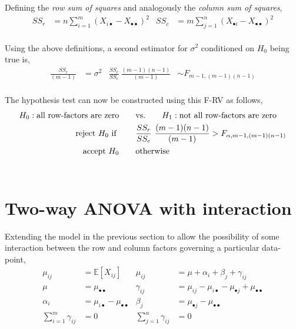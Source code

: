 Defining the \textit{row sum of squares} and analogously the \textit{column sum of squares}, \\

\begin{align}
	SS_r &= n\sum\limits_{i = 1}^{m} (X_{i\bullet}  - X_{\bullet \bullet})^2 & SS_c &= m\sum\limits_{j = 1}^{n} (X_{\bullet i}  - X_{\bullet \bullet})^2 
\end{align}\\

Using the above definitions, a second estimator for $ \sigma^2 $ conditioned on $ H_0 $ being true is,\\

\begin{align}
	\frac{SS_r}{(m-1)} &= \sigma^2 & \frac{SS_r}{SS_e}\ \frac{(m-1)(n-1)}{(m-1)} &\sim F_{m-1, (m-1) (n-1)}
\end{align}\\

The hypothesis test can now be constructed using this F-RV as follows,\\

\begin{align}
	H_0 : \text{all row-factors are zero} \qquad &\text{vs.} \qquad H_1 : \text{not all row-factors are zero} \nonumber \\
	\text{reject $ H_0 $ if } \qquad & \frac{SS_r}{SS_e}\ \frac{(m-1)(n-1)}{(m-1)} > F_{\alpha, m-1, (m-1) (n-1)} \nonumber \\
	\text{accept $ H_0 $} \qquad & \text{otherwise}
\end{align}\\

\section{Two-way ANOVA with interaction} 

Extending the model in the previous section to allow the possibility of some interaction between the row and column factors governing a particular data-point, \\

\begin{align}
	\mu_{ij} &= \mathbb{E}[X_{ij}] & \mu_{ij} &= \mu + \alpha_i + \beta_j + \gamma_{ij} \\
	\mu &= \mu_{\bullet \bullet} & \gamma_{ij} &= \mu_{ij} - \mu_{i\bullet} - \mu_{\bullet j} + \mu_{\bullet \bullet} \\
	\alpha_i &= \mu_{i\bullet} - \mu_{\bullet \bullet} & \beta_j &= \mu_{\bullet j} - \mu_{\bullet \bullet} \\
	\sum\limits_{i = 1}^{m} \gamma_{ij} &= 0 & \sum\limits_{j = 1}^{n} \gamma_{ij} &= 0
\end{align}\\

